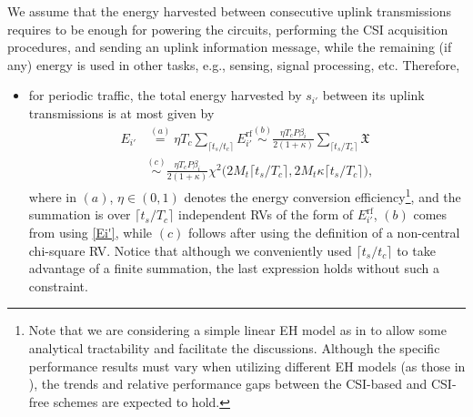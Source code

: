\documentclass[10pt,journal,a4paper]{IEEEtran}
\begin{document}
	We assume that the energy harvested between consecutive uplink transmissions requires to be enough  for powering the circuits, performing the CSI acquisition procedures, and sending an uplink information message, while the remaining (if any) energy is used in other tasks, e.g., sensing, signal processing, etc. Therefore,
	\begin{itemize}
		\item for periodic traffic, the total energy harvested by $s_{i'}$ between its uplink transmissions is at most given by
		\begin{align}
		E_{i'}&\stackrel{(a)}{=}\eta T_c \sum_{\lceil t_s/t_c\rceil} E_{i'}^\mathrm{rf} \stackrel{(b)}{\sim}\frac{\eta T_c P\beta_i}{2(1+\kappa)} \sum_{{\lceil t_s/T_c\rceil}}\mathfrak{X}\nonumber\\
		&\stackrel{(c)}{\sim}\frac{\eta T_c P\beta_i}{2(1+\kappa)} \chi^2\big(2M_t  \lceil  t_s/T_c\rceil, 2M_t\kappa \lceil t_s/T_c\rceil \big),
		\end{align}
		where in $(a)$, $\eta\in(0,1)$ denotes the energy conversion efficiency\footnote{Note that we are considering a simple linear EH model as in \cite{Ghazanfari.2016,Ju.2014,Lopez.2017,Huang.2016,Chen.2015,LopezFernandez.2018,Makki.2016,Khan.2016,Thudugalage.2016} to allow some analytical tractability and facilitate the discussions. Although the specific performance results must vary when utilizing different EH models (as those in \cite{Lopez.2018,Lopez.2019_CSI,Clerckx.2019,Cantos.2019,Du.2020,Clerckx.2018,Lopez.2020}), the trends and relative performance gaps between the CSI-based and CSI-free schemes are expected to hold.}, and the summation is over $\lceil t_s/T_c\rceil$ independent RVs of the form of $E_{i'}^\mathrm{rf}$, $(b)$ comes from using \eqref{Ei'}, while $(c)$ follows after using the definition of a non-central chi-square RV. Notice that although we conveniently used  $\lceil t_s/t_c\rceil$ to take advantage of a finite summation, the last expression holds without such a constraint.
		

\end{itemize}
\end{document}
